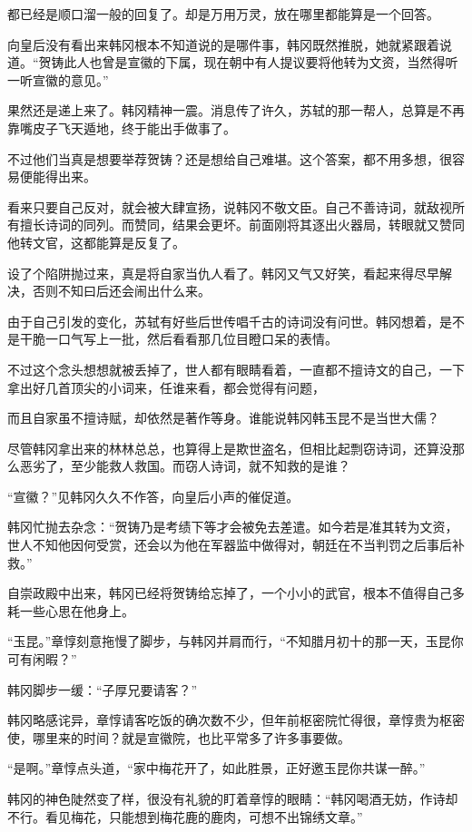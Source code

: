 都已经是顺口溜一般的回复了。却是万用万灵，放在哪里都能算是一个回答。

向皇后没有看出来韩冈根本不知道说的是哪件事，韩冈既然推脱，她就紧跟着说道。“贺铸此人也曾是宣徽的下属，现在朝中有人提议要将他转为文资，当然得听一听宣徽的意见。”

果然还是递上来了。韩冈精神一震。消息传了许久，苏轼的那一帮人，总算是不再靠嘴皮子飞天遁地，终于能出手做事了。

不过他们当真是想要举荐贺铸？还是想给自己难堪。这个答案，都不用多想，很容易便能得出来。

看来只要自己反对，就会被大肆宣扬，说韩冈不敬文臣。自己不善诗词，就敌视所有擅长诗词的同列。而赞同，结果会更坏。前面刚将其逐出火器局，转眼就又赞同他转文官，这都能算是反复了。

设了个陷阱抛过来，真是将自家当仇人看了。韩冈又气又好笑，看起来得尽早解决，否则不知曰后还会闹出什么来。

由于自己引发的变化，苏轼有好些后世传唱千古的诗词没有问世。韩冈想着，是不是干脆一口气写上一批，然后看看那几位目瞪口呆的表情。

不过这个念头想想就被丢掉了，世人都有眼睛看着，一直都不擅诗文的自己，一下拿出好几首顶尖的小词来，任谁来看，都会觉得有问题，

而且自家虽不擅诗赋，却依然是著作等身。谁能说韩冈韩玉昆不是当世大儒？

尽管韩冈拿出来的林林总总，也算得上是欺世盗名，但相比起剽窃诗词，还算没那么恶劣了，至少能救人救国。而窃人诗词，就不知救的是谁？

“宣徽？”见韩冈久久不作答，向皇后小声的催促道。

韩冈忙抛去杂念：“贺铸乃是考绩下等才会被免去差遣。如今若是准其转为文资，世人不知他因何受赏，还会以为他在军器监中做得对，朝廷在不当判罚之后事后补救。”

自崇政殿中出来，韩冈已经将贺铸给忘掉了，一个小小的武官，根本不值得自己多耗一些心思在他身上。

“玉昆。”章惇刻意拖慢了脚步，与韩冈并肩而行，“不知腊月初十的那一天，玉昆你可有闲暇？”

韩冈脚步一缓：“子厚兄要请客？”

韩冈略感诧异，章惇请客吃饭的确次数不少，但年前枢密院忙得很，章惇贵为枢密使，哪里来的时间？就是宣徽院，也比平常多了许多事要做。

“是啊。”章惇点头道，“家中梅花开了，如此胜景，正好邀玉昆你共谋一醉。”

韩冈的神色陡然变了样，很没有礼貌的盯着章惇的眼睛：“韩冈喝酒无妨，作诗却不行。看见梅花，只能想到梅花鹿的鹿肉，可想不出锦绣文章。”

